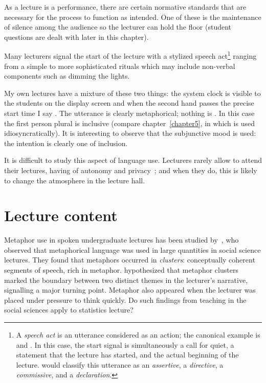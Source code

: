 As a lecture is a performance, there are certain normative standards
that are necessary for the process to function as intended.  One of
these is the maintenance of silence among the audience so the lecturer
can hold the floor (student questions are dealt with later in this
chapter).

Many lecturers signal the start of the lecture with a stylized speech
act\footnote{A \emph{speech act} is an utterance considered as an
  action; the canonical example is  and .  In this case, the
  start signal is simultaneously a call for quiet, a statement that
  the lecture has started, and the actual beginning of the lecture.
   would classify this utterance as an
  \emph{assertive}, a \emph{directive}, a \emph{commissive}, and a
  \emph{declaration}.} ranging from a simple  to
more sophisticated rituals which may include non-verbal components
such as dimming the lights.

My own lectures have a mixture of these two things: the system clock
is visible to the students on the display screen and when the second
hand passes the precise start time I say .
The utterance is clearly metaphorical; nothing is .  In
this case the first person plural is inclusive (compare
chapter~\ref{chapter5}, in which  is used
idiosyncratically).  It is interesting to observe that the subjunctive
mood is used: the intention is clearly one of inclusion.

It is difficult to study this aspect of language use.  Lecturers 
rarely allow  to attend their lectures, having
 of autonomy and
privacy~\parencite{evans2012}; and when they do, this is likely to
change the atmosphere in the lecture hall.


\section{Lecture content}

Metaphor use in spoken undergraduate lectures has been studied
by~, who observed that metaphorical language was used in
large quantities in social science lectures.  They found that
metaphors occurred in \emph{clusters}: conceptually coherent segments
of speech, rich in metaphor.  \citeauthor{low2008} hypothesized that
metaphor clusters marked the boundary between two distinct themes in
the lecturer's narrative, signalling a major turning point.  Metaphor
also appeared when the lecturer was placed under pressure to think
quickly.  Do such findings from teaching in the social sciences apply
to statistics lecture?

